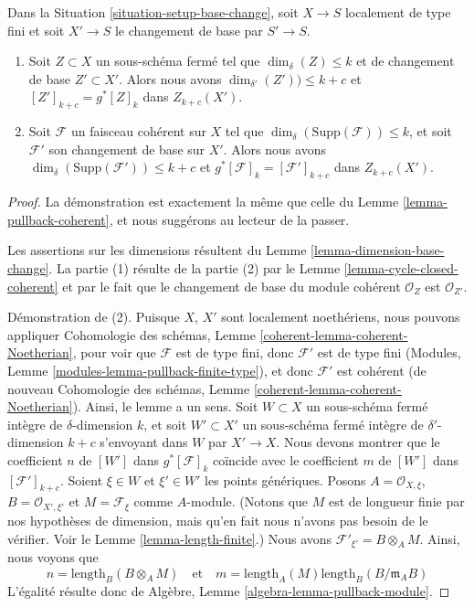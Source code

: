 \begin{lemma}
\label{lemma-pullback-coherent-base-change}
Dans la Situation \ref{situation-setup-base-change}, soit $X \to S$
localement de type fini et soit $X' \to S$ le changement de base par $S' \to S$.
\begin{enumerate}
\item Soit $Z \subset X$ un sous-schéma fermé tel que
$\dim_\delta(Z) \leq k$ et de changement de base $Z' \subset X'$. Alors nous avons
$\dim_{\delta'}(Z')) \leq k + c$
et $[Z']_{k + c} = g^*[Z]_k$ dans $Z_{k + c}(X')$.
\item Soit $\mathcal{F}$ un faisceau cohérent sur $X$ tel que
$\dim_\delta(\text{Supp}(\mathcal{F})) \leq k$, et soit
$\mathcal{F}'$ son changement de base sur $X'$.
Alors nous avons $\dim_\delta(\text{Supp}(\mathcal{F}')) \leq k + c$
et $g^*[\mathcal{F}]_k = [\mathcal{F}']_{k + c}$
dans $Z_{k + c}(X')$.
\end{enumerate}
\end{lemma}

\begin{proof}
La démonstration est exactement la même que celle du
Lemme \ref{lemma-pullback-coherent},
et nous suggérons au lecteur de la passer.

\medskip\noindent
Les assertions sur les dimensions résultent du
Lemme \ref{lemma-dimension-base-change}.
La partie (1) résulte de la partie (2) par le Lemme \ref{lemma-cycle-closed-coherent}
et par le fait que le changement de base du module cohérent $\mathcal{O}_Z$
est $\mathcal{O}_{Z'}$.

\medskip\noindent
Démonstration de (2). Puisque $X$, $X'$ sont localement noethériens, nous pouvons appliquer
Cohomologie des schémas, Lemme \ref{coherent-lemma-coherent-Noetherian}, pour voir
que $\mathcal{F}$ est de type fini, donc $\mathcal{F}'$ est
de type fini (Modules, Lemme \ref{modules-lemma-pullback-finite-type}),
et donc $\mathcal{F}'$ est cohérent
(de nouveau Cohomologie des schémas, Lemme \ref{coherent-lemma-coherent-Noetherian}).
Ainsi, le lemme a un sens. Soit $W \subset X$ un sous-schéma fermé intègre
de $\delta$-dimension $k$, et soit $W' \subset X'$ un sous-schéma
fermé intègre de $\delta'$-dimension $k + c$ s'envoyant dans $W$
par $X' \to X$. Nous devons montrer que le coefficient $n$ de
$[W']$ dans $g^*[\mathcal{F}]_k$ coïncide avec le coefficient
$m$ de $[W']$ dans $[\mathcal{F}']_{k + c}$. Soient $\xi \in W$ et
$\xi' \in W'$ les points génériques. Posons
$A = \mathcal{O}_{X, \xi}$, $B = \mathcal{O}_{X', \xi'}$
et $M = \mathcal{F}_\xi$ comme $A$-module. (Notons que
$M$ est de longueur finie par nos hypothèses de dimension, mais qu'en fait nous
n'avons pas besoin de le vérifier. Voir le
Lemme \ref{lemma-length-finite}.)
Nous avons $\mathcal{F}'_{\xi'} = B \otimes_A M$.
Ainsi, nous voyons que
$$
n = \text{length}_B(B \otimes_A M)
\quad
\text{et}
\quad
m = \text{length}_A(M) \text{length}_B(B/\mathfrak m_AB)
$$
L'égalité résulte donc de
Algèbre, Lemme \ref{algebra-lemma-pullback-module}.
\end{proof}

